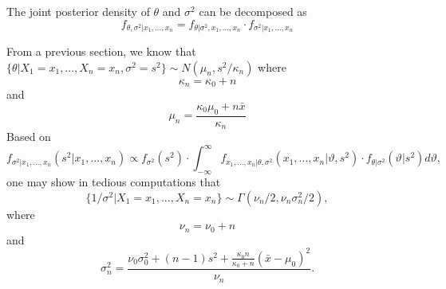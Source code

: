 The joint posterior density of \( \theta \) and \( \sigma^2 \) can be decomposed as
\[ f_{\theta, \sigma^2 | x_1, ..., x_n} = f_{\theta | \sigma^2, x_1, ..., x_n} \cdot f_{\sigma^2 | x_1, ..., x_n} \]

From a previous section, we know that
\( \{\theta | X_1 = x_1, ..., X_n = x_n, \sigma^2 = s^2 \} \sim N(\mu_n, s^2/\kappa_n) \)
where
\[ \kappa_n = \kappa_0 + n \]
and
\[ \mu_n = \frac{\kappa_0\mu_0 + n\bar{x}}{\kappa_n} \]
Based on
\[ f_{\sigma^2 | x_1, ..., x_n}(s^2 | x_1, ..., x_n) \propto f_{\sigma^2}(s^2) \cdot \int_{-\infty}^{\infty} f_{x_1, ..., x_n | \theta, \sigma^2}(x_1, ..., x_n | \vartheta, s^2) \cdot f_{\theta | \sigma^2}(\vartheta | s^2) d\vartheta, \]
one may show in tedious computations that
\[ \{1/\sigma^2 | X_1 = x_1, ..., X_n = x_n \} \sim \Gamma(\nu_n/2, \nu_n \sigma_n^2/2), \]
where
\[ \nu_n = \nu_0 + n \]
and
\[ \sigma_n^2 = \frac{\nu_0 \sigma_0^2 + (n-1)s^2 + \frac{\kappa_0 n}{\kappa_0 + n}(\bar{x} - \mu_0)^2}{\nu_n}. \]
\fi

